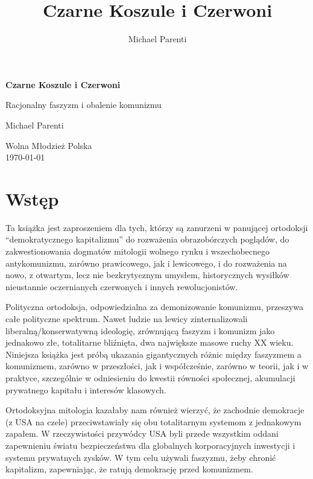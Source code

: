 \documentclass[12pt]{book}
\title{Czarne Koszule i Czerwoni}
\author{Michael Parenti}
\begin{document}
\frontmatter

\begin{titlepage}

    \centering
    \vspace*{1cm}
    
    {\Huge \textbf{Czarne Koszule i Czerwoni}\par}
    \vspace{0.5cm}
    {\Large Racjonalny faszyzm i obalenie komunizmu\par}
    
    \vspace{1.5cm}
    {\large Michael Parenti\par}
    
    \vfill
    
    {\large Wolna Młodzież Polska\\
    \today\par}

\end{titlepage}

\setcounter{chapter}{0}
\tableofcontents

\chapter*{Wstęp}
Ta książka jest zaproszeniem dla tych, którzy są zanurzeni w panującej ortodoksji ``demokratycznego kapitalizmu'' do rozważenia obrazobórczych poglądów, do zakwestionowania dogmatów mitologii wolnego rynku i wszechobecnego antykomunizmu, zarówno prawicowego, jak i lewicowego, i do rozważenia na nowo, z otwartym, lecz nie bezkrytycznym umysłem, historycznych wysiłków nieustannie oczernianych czerwonych i innych rewolucjonistów.

Polityczna ortodoksja, odpowiedzialna za demonizowanie komunizmu, przeszywa całe polityczne spektrum. Nawet ludzie na lewicy zinternalizowali liberalną/konserwatywną ideologię, zrównującą faszyzm i komunizm jako jednakowo złe, totalitarne bliźnięta, dwa największe masowe ruchy XX wieku. Niniejsza książka jest próbą ukazania gigantycznych różnic między faszyzmem a komunizmem, zarówno w przeszłości, jak i współcześnie, zarówno w teorii, jak i w praktyce, szczególnie w odniesieniu do kwestii równości społecznej, akumulacji prywatnego kapitału i interesów klasowych.

Ortodoksyjna mitologia kazałaby nam również wierzyć, że zachodnie demokracje (z USA na czele) przeciwstawiały się obu totalitarnym systemom z jednakowym zapałem. W rzeczywistości przywódcy USA byli przede wszystkim oddani zapewnieniu światu bezpieczeństwa dla globalnych korporacyjnych inwestycji i systemu prywatnych zysków. W tym celu używali faszyzmu, żeby chronić kapitalizm, zapewniając, że ratują demokrację przed komunizmem.
\end{document}
